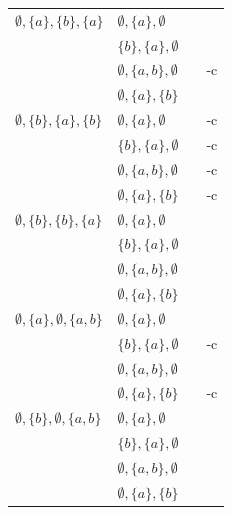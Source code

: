 \begin{longtable}{l | l | l | l}
	\hline
	
	$\emptyset,\{a\},\{b\},\{a\}$ &
	$\emptyset,\{a\},\emptyset$ & {\textXeabaXeae} & \NL \\
	& $\{b\},\{a\},\emptyset$ & {\textXeabaXbae} & \NL \\
	& $\emptyset,\{a,b\},\emptyset$ & {\textXeabaXeabe} & \PSPACE-c \\
	& $\emptyset,\{a\},\{b\}$ & {\textXeabaXeab} & \NL \\
	
	\hline
	
	$\emptyset,\{b\},\{a\},\{b\}$ &
	$\emptyset,\{a\},\emptyset$ & {\textXebabXeae} & \PSPACE-c \\
	& $\{b\},\{a\},\emptyset$ & {\textXebabXbae} & \PSPACE-c \\
	& $\emptyset,\{a,b\},\emptyset$ & {\textXebabXeabe} & \PSPACE-c \\
	& $\emptyset,\{a\},\{b\}$ & {\textXebabXeab} & \PSPACE-c \\
	
	\hline
	
	$\emptyset,\{b\},\{b\},\{a\}$ &
	$\emptyset,\{a\},\emptyset$ & {\textXebbaXeae} & \NL \\
	& $\{b\},\{a\},\emptyset$ & {\textXebbaXbae} & \NL \\
	& $\emptyset,\{a,b\},\emptyset$ & {\textXebbaXeabe} & \NL \\
	& $\emptyset,\{a\},\{b\}$ & {\textXebbaXeab} & \NL \\
	
	\hline
	
	$\emptyset,\{a\},\emptyset,\{a,b\}$ &
	$\emptyset,\{a\},\emptyset$ & {\textXeaeabXeae} & \NL \\
	& $\{b\},\{a\},\emptyset$ & {\textXeaeabXbae} & \PSPACE-c \\
	& $\emptyset,\{a,b\},\emptyset$ & {\textXeaeabXeabe} & \NL \\
	& $\emptyset,\{a\},\{b\}$ & {\textXeaeabXeab} & \PSPACE-c \\
	
	\hline
	
	$\emptyset,\{b\},\emptyset,\{a,b\}$ &
	$\emptyset,\{a\},\emptyset$ & {\textXebeabXeae} & \NL \\
	& $\{b\},\{a\},\emptyset$ & {\textXebeabXbae} & \NL \\
	& $\emptyset,\{a,b\},\emptyset$ & {\textXebeabXeabe} & \NL \\
	& $\emptyset,\{a\},\{b\}$ & {\textXebeabXeab} & \NL \\
\end{longtable}